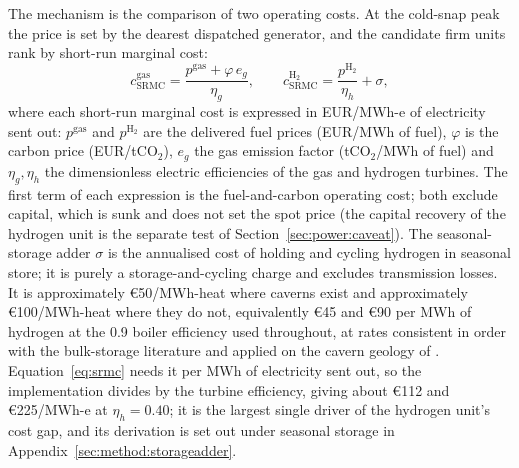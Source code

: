 The mechanism is the comparison of two operating costs. At the cold-snap peak the price is set by
the dearest dispatched generator, and the candidate firm units rank by short-run marginal cost:
\begin{equation}
    c^{\text{gas}}_{\text{SRMC}} = \frac{p^{\text{gas}} + \varphi\, e_g}{\eta_g},
    \qquad
    c^{\text{H}_2}_{\text{SRMC}} = \frac{p^{\text{H}_2}}{\eta_h} + \sigma,
    \label{eq:srmc}
\end{equation}
where each short-run marginal cost is expressed in EUR/MWh-e of electricity sent out:
$p^{\text{gas}}$ and $p^{\text{H}_2}$ are the delivered fuel prices (EUR/MWh of fuel),
$\varphi$ is the carbon price (EUR/tCO$_2$), $e_g$ the gas emission factor (tCO$_2$/MWh
of fuel) and $\eta_g,\eta_h$ the dimensionless electric efficiencies of the gas and
hydrogen turbines. The first term of each expression is the fuel-and-carbon operating
cost; both exclude capital, which is sunk and does not set the spot price (the capital
recovery of the hydrogen unit is the separate test of Section~\ref{sec:power:caveat}).
The seasonal-storage adder $\sigma$ is the annualised cost of holding and cycling
hydrogen in seasonal store; it is purely a storage-and-cycling charge and excludes
transmission losses. It is approximately \euro{}50/MWh-heat where caverns exist and approximately
\euro{}100/MWh-heat where they do not, equivalently \euro{}45 and \euro{}90 per MWh of
hydrogen at the 0.9 boiler efficiency used throughout, at rates consistent in order with
the bulk-storage literature \citep{Lord2014GeologicStorage,Papadias2021BulkStorage,Talukdar2024UHSEurope} and
applied on the cavern geology of \citet{Caglayan2020caverns}. Equation~\eqref{eq:srmc} needs it per MWh of
electricity sent out, so the implementation divides by the turbine efficiency, giving
about \euro{}112 and \euro{}225/MWh-e at $\eta_h=0.40$; it is the largest single driver of the hydrogen unit's cost gap, and its derivation is
set out under seasonal storage in Appendix~\ref{sec:method:storageadder}.

